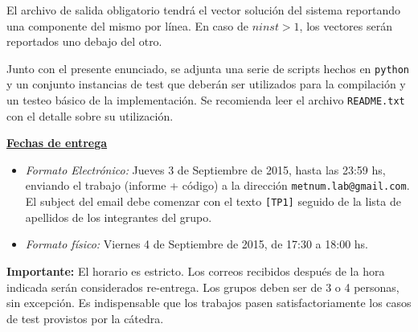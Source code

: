 El archivo de salida obligatorio tendr\'a el vector soluci\'on del sistema reportando una componente del mismo por
l\'inea. En caso de $ninst > 1$, los vectores ser\'an reportados uno debajo del otro.

Junto con el presente enunciado, se adjunta una serie de scripts hechos en \verb+python+ y un conjunto instancias de
test que deber\'an ser utilizados para la compilaci\'on y un testeo b\'asico de la implementaci\'on. Se recomienda leer
el archivo \verb+README.txt+ con el detalle sobre su utilizaci\'on.

{\bf \underline{Fechas de entrega}}
\begin{itemize}
\item \emph{Formato Electr\'onico:} Jueves 3 de Septiembre de 2015, hasta las 23:59 hs, enviando el trabajo (informe +
c\'odigo) a la direcci\'on \verb+metnum.lab@gmail.com+. El subject del email debe comenzar con el texto \verb+[TP1]+
seguido de la lista de apellidos de los integrantes del grupo.
\item \emph{Formato f\'isico:} Viernes 4 de Septiembre de 2015, de 17:30 a 18:00 hs.
\end{itemize}

\noindent \textbf{Importante:} El horario es estricto. Los correos recibidos despu\'es de la hora indicada ser\'an
considerados re-entrega. Los grupos deben ser de 3 o 4 personas, sin excepci\'on. Es indispensable que los trabajos
pasen satisfactoriamente los casos de test provistos por la c\'atedra.
